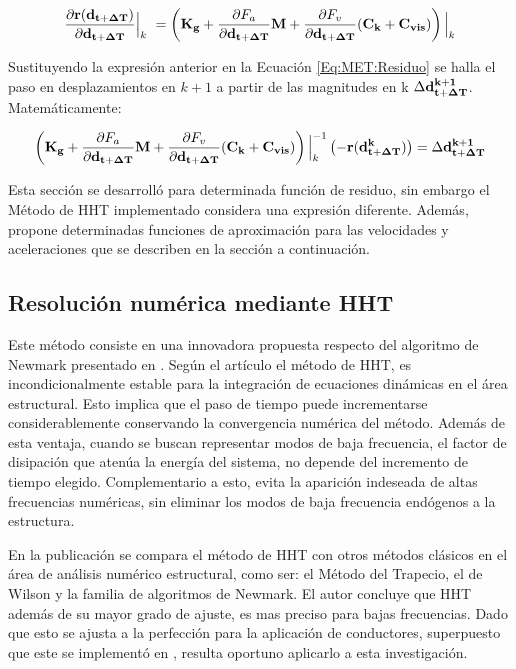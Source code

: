 \begin{equation}\label{Eq:PRE:DerivadaResiduo}
	\frac{\partial  \bf{r}(\bf{d}_{t+\Delta T})}{\partial \bf{d}_{t+\Delta T}}\Big|_k~
	= \left (\bf{K}_g+\frac{\partial\text{$ F_a$}}{\partial \bf{{d}}_{t+\Delta T}}\bf{M} + \frac{\partial\text{$ F_v$}}{\partial \bf{{d}}_{t+\Delta T}}(\bf{C}_k+\bf{C}_{vis}) \right)\Big|_k
\end{equation}

Sustituyendo la expresión anterior en la Ecuación \eqref{Eq:MET:Residuo} se halla el paso en desplazamientos en $k+1$ a partir de las magnitudes en k $\Delta \bf{d}^{k+1}_{t+\Delta T}$. Matemáticamente:

\begin{equation}\label{Eq:Pre:Incremento}
	\left (\bf{K}_g+\frac{\partial\text{$ F_a$}}{\partial \bf{{d}}_{t+\Delta T}}\bf{M} + \frac{\partial\text{$ F_v$}}{\partial \bf{{d}}_{t+\Delta T}}(\bf{C}_k+\bf{C}_{vis} )  \right)\Big|_k^{-1} \left(-\bf{r}(\bf{d}^k_{t+\Delta T})\right)=  \Delta\bf{d}^{k+1}_{t+\Delta T}
\end{equation}

Esta sección se desarrolló para determinada función de residuo, sin embargo el Método de HHT implementado considera una expresión diferente. Además, propone determinadas funciones de aproximación para las velocidades y aceleraciones que se describen en la sección a continuación. 


\subsection{Resolución numérica mediante HHT}\label{Sec:MET:HHT}
Este método consiste en una innovadora propuesta respecto del algoritmo de Newmark presentado en \cite{newmark1959method}. Según el artículo \cite{hilber1977improved} el método de HHT, es incondicionalmente estable para la integración de ecuaciones dinámicas en el área estructural. Esto implica que el paso de tiempo puede incrementarse considerablemente conservando la convergencia numérica del método. Además de esta ventaja, cuando se buscan representar modos de baja frecuencia, el factor de disipación que atenúa la energía del sistema, no depende del incremento de tiempo elegido. Complementario a esto, evita la aparición indeseada de altas frecuencias numéricas, sin eliminar los modos de baja frecuencia endógenos a la estructura. 

En la publicación \citep{hilber1977improved} se compara el método de HHT con otros métodos clásicos en el área de análisis numérico estructural, como ser: el Método del Trapecio, el de Wilson y la familia de algoritmos de Newmark. El autor concluye que HHT además de su mayor grado de ajuste, es mas preciso para bajas frecuencias. Dado que esto se ajusta a la perfección para la aplicación de conductores, superpuesto que este se implementó en \cite{Le2014}, resulta oportuno aplicarlo a esta investigación.

